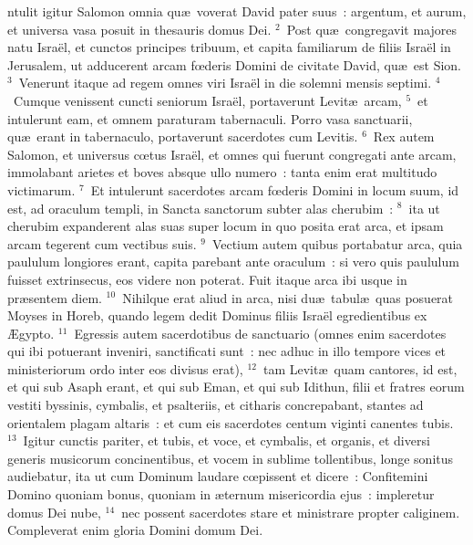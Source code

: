 \bchapter
{}ntulit igitur Salomon omnia qu\ae\ voverat David pater suus~: argentum, et aurum, et universa vasa posuit in thesauris domus Dei.
${}^{2}$~Post qu\ae\ congregavit majores natu Isra\"el, et cunctos principes tribuum, et capita familiarum de filiis Isra\"el in Jerusalem, ut adducerent arcam fœderis Domini de civitate David, qu\ae\ est Sion.
${}^{3}$~Venerunt itaque ad regem omnes viri Isra\"el in die solemni mensis septimi.
${}^{4}$~Cumque venissent cuncti seniorum Isra\"el, portaverunt Levit\ae\ arcam,
${}^{5}$~et intulerunt eam, et omnem paraturam tabernaculi. Porro vasa sanctuarii, qu\ae\ erant in tabernaculo, portaverunt sacerdotes cum Levitis.
${}^{6}$~Rex autem Salomon, et universus cœtus Isra\"el, et omnes qui fuerunt congregati ante arcam, immolabant arietes et boves absque ullo numero~: tanta enim erat multitudo victimarum.
${}^{7}$~Et intulerunt sacerdotes arcam fœderis Domini in locum suum, id est, ad oraculum templi, in Sancta sanctorum subter alas cherubim~:
${}^{8}$~ita ut cherubim expanderent alas suas super locum in quo posita erat arca, et ipsam arcam tegerent cum vectibus suis.
${}^{9}$~Vectium autem quibus portabatur arca, quia paululum longiores erant, capita parebant ante oraculum~: si vero quis paululum fuisset extrinsecus, eos videre non poterat. Fuit itaque arca ibi usque in pr\ae sentem diem.
${}^{10}$~Nihilque erat aliud in arca, nisi du\ae\ tabul\ae\ quas posuerat Moyses in Horeb, quando legem dedit Dominus filiis Isra\"el egredientibus ex \AE gypto.
${}^{11}$~Egressis autem sacerdotibus de sanctuario (omnes enim sacerdotes qui ibi potuerant inveniri, sanctificati sunt~: nec adhuc in illo tempore vices et ministeriorum ordo inter eos divisus erat),
${}^{12}$~tam Levit\ae\ quam cantores, id est, et qui sub Asaph erant, et qui sub Eman, et qui sub Idithun, filii et fratres eorum vestiti byssinis, cymbalis, et psalteriis, et citharis concrepabant, stantes ad orientalem plagam altaris~: et cum eis sacerdotes centum viginti canentes tubis.
${}^{13}$~Igitur cunctis pariter, et tubis, et voce, et cymbalis, et organis, et diversi generis musicorum concinentibus, et vocem in sublime tollentibus, longe sonitus audiebatur, ita ut cum Dominum laudare cœpissent et dicere~: Confitemini Domino quoniam bonus, quoniam in \ae ternum misericordia ejus~: impleretur domus Dei nube,
${}^{14}$~nec possent sacerdotes stare et ministrare propter caliginem. Compleverat enim gloria Domini domum Dei.

